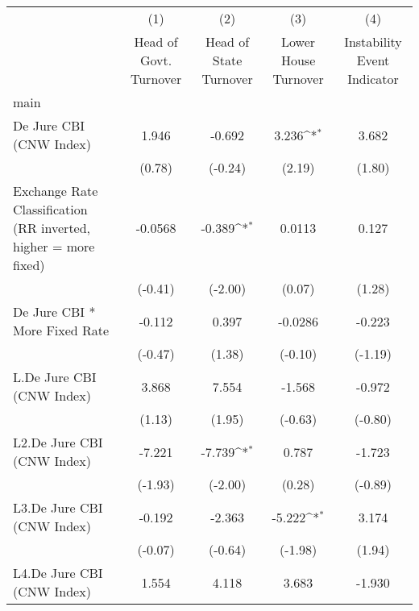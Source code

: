 {
\def\sym#1{\ifmmode^{#1}\else\(^{#1}\)\fi}
\begin{longtable}{l*{4}{c}}
\toprule\endfirsthead\midrule\endhead\midrule\endfoot\endlastfoot
                &\multicolumn{1}{c}{(1)}&\multicolumn{1}{c}{(2)}&\multicolumn{1}{c}{(3)}&\multicolumn{1}{c}{(4)}\\
                &\multicolumn{1}{c}{Head of Govt. Turnover}&\multicolumn{1}{c}{Head of State Turnover}&\multicolumn{1}{c}{Lower House Turnover}&\multicolumn{1}{c}{Instability Event Indicator}\\
\midrule
main            &                  &                  &                  &                  \\
De Jure CBI (CNW Index)&    1.946         &   -0.692         &    3.236\sym{*}  &    3.682         \\
                &   (0.78)         &  (-0.24)         &   (2.19)         &   (1.80)         \\
\addlinespace
Exchange Rate Classification (RR inverted, higher = more fixed)&  -0.0568         &   -0.389\sym{*}  &   0.0113         &    0.127         \\
                &  (-0.41)         &  (-2.00)         &   (0.07)         &   (1.28)         \\
\addlinespace
De Jure CBI * More Fixed Rate&   -0.112         &    0.397         &  -0.0286         &   -0.223         \\
                &  (-0.47)         &   (1.38)         &  (-0.10)         &  (-1.19)         \\
\addlinespace
L.De Jure CBI (CNW Index)&    3.868         &    7.554         &   -1.568         &   -0.972         \\
                &   (1.13)         &   (1.95)         &  (-0.63)         &  (-0.80)         \\
\addlinespace
L2.De Jure CBI (CNW Index)&   -7.221         &   -7.739\sym{*}  &    0.787         &   -1.723         \\
                &  (-1.93)         &  (-2.00)         &   (0.28)         &  (-0.89)         \\
\addlinespace
L3.De Jure CBI (CNW Index)&   -0.192         &   -2.363         &   -5.222\sym{*}  &    3.174         \\
                &  (-0.07)         &  (-0.64)         &  (-1.98)         &   (1.94)         \\
\addlinespace
L4.De Jure CBI (CNW Index)&    1.554         &    4.118         &    3.683         &   -1.930         \\

\end{longtable}}
